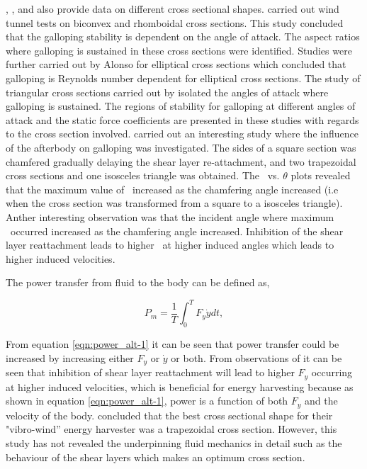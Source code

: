  
\citet{Naudascher1993}, \citet{Ruscheweyh1996}, \citet{Deniz1997} and \citet{Weaver2005} also provide data on different cross sectional shapes. \citet{Alonso2009} carried out wind tunnel tests on biconvex and rhomboidal cross sections. This study concluded that the galloping stability is dependent on the angle of attack. The aspect ratios where galloping is sustained in these cross sections were identified. Studies were further carried out by Alonso for elliptical cross sections \citep{Alonso2010} which concluded that galloping is Reynolds number dependent for elliptical cross sections. The study of triangular cross sections carried out by \citep{Alonso2005} isolated the angles of attack where galloping is sustained. The regions of stability for galloping at different angles of attack and the static force coefficients are presented in these studies with regards to the cross section involved. \citet{Luo1994} carried out an interesting study where the influence of the afterbody on galloping was investigated. The sides of a square section was chamfered gradually delaying the shear layer re-attachment, and two trapezoidal cross sections and one isosceles triangle was obtained. The \cy\ vs. $\theta$ plots revealed that the maximum value of \cy\ increased as the chamfering angle increased (i.e when the cross section was transformed from a square to a isosceles triangle). Anther interesting observation was that the incident angle where maximum \cy\ occurred increased as the chamfering angle increased. Inhibition of the shear layer reattachment leads to higher \cy\ at higher induced angles which leads to higher induced velocities. 

The power transfer from fluid to the body can be defined as,

\begin{equation}
\label{eqn:power_alt-1}
P_{m}=\frac{1}{T}\int_{0}^{T}F_y\dot{y} dt,
\end{equation}

From equation \ref{eqn:power_alt-1} it can be seen that power transfer could be increased by increasing either $F_{y}$ or $\dot{y}$ or both. From observations of \citet{Luo1994} it can be seen that inhibition of shear layer reattachment will lead to higher $F_{y}$ occurring at higher induced velocities, which is beneficial for energy harvesting because as shown in equation \ref{eqn:power_alt-1}, power is a function of both $F_{y}$ and the velocity of the body. \citet{Kluger2013} concluded that the best cross sectional shape for their "vibro-wind'' energy harvester was a trapezoidal cross section. However, this study has not revealed the underpinning fluid mechanics in detail such as the behaviour of the shear layers which makes an optimum cross section.

